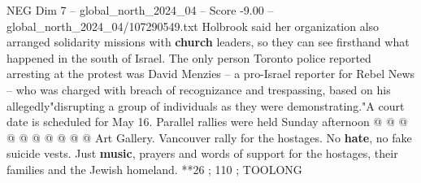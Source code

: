 \begin{textsample}{NEG Dim 7 – global\_north\_2024\_04 – Score -9.00 – global\_north\_2024\_04/107290549.txt}
Holbrook said her organization also arranged solidarity missions with \textbf{church} leaders, so they can see firsthand what happened in the south of Israel.
The only person Toronto police reported arresting at the protest was David Menzies -- a pro-Israel reporter for Rebel News -- who was charged with breach of recognizance and trespassing, based on his allegedly"disrupting a group of individuals as they were demonstrating."A court date is scheduled for May 16.
Parallel rallies were held Sunday afternoon @ @ @ @ @ @ @ @ @ @ Art Gallery.
Vancouver rally for the hostages.
No \textbf{hate}, no fake suicide vests.
Just \textbf{music}, prayers and words of support for the hostages, their families and the Jewish homeland. **26 ; 110 ; TOOLONG

\end{textsample}
